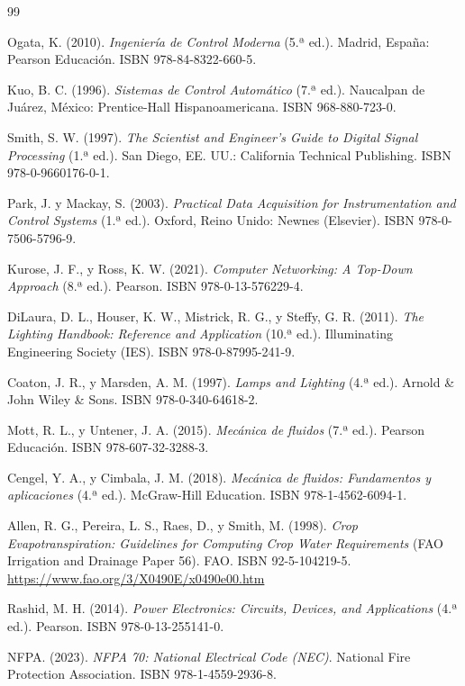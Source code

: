 \renewcommand{\bibname}{Bibliografía}
\begin{thebibliography}{99}

Ogata, K. (2010). \textit{Ingeniería de Control Moderna} (5.ª ed.). Madrid, España: Pearson Educación. ISBN 978-84-8322-660-5.

Kuo, B. C. (1996). \textit{Sistemas de Control Automático} (7.ª ed.). Naucalpan de Juárez, México: Prentice-Hall Hispanoamericana. ISBN 968-880-723-0.

Smith, S. W. (1997). \textit{The Scientist and Engineer's Guide to Digital Signal Processing} (1.ª ed.). San Diego, EE. UU.: California Technical Publishing. ISBN 978-0-9660176-0-1.

Park, J. y Mackay, S. (2003). \textit{Practical Data Acquisition for Instrumentation and Control Systems} (1.ª ed.). Oxford, Reino Unido: Newnes (Elsevier). ISBN 978-0-7506-5796-9.

Kurose, J. F., y Ross, K. W. (2021). \textit{Computer Networking: A Top-Down Approach} (8.ª ed.). Pearson. ISBN 978-0-13-576229-4.

DiLaura, D. L., Houser, K. W., Mistrick, R. G., y Steffy, G. R. (2011). \textit{The Lighting Handbook: Reference and Application} (10.ª ed.). Illuminating Engineering Society (IES). ISBN 978-0-87995-241-9.

Coaton, J. R., y Marsden, A. M. (1997). \textit{Lamps and Lighting} (4.ª ed.). Arnold \& John Wiley \& Sons. ISBN 978-0-340-64618-2.

Mott, R. L., y Untener, J. A. (2015). \textit{Mecánica de fluidos} (7.ª ed.). Pearson Educación. ISBN 978-607-32-3288-3.

Cengel, Y. A., y Cimbala, J. M. (2018). \textit{Mecánica de fluidos: Fundamentos y aplicaciones} (4.ª ed.). McGraw-Hill Education. ISBN 978-1-4562-6094-1.

Allen, R. G., Pereira, L. S., Raes, D., y Smith, M. (1998). \textit{Crop Evapotranspiration: Guidelines for Computing Crop Water Requirements} (FAO Irrigation and Drainage Paper 56). FAO. ISBN 92-5-104219-5. \url{https://www.fao.org/3/X0490E/x0490e00.htm}

Rashid, M. H. (2014). \textit{Power Electronics: Circuits, Devices, and Applications} (4.ª ed.). Pearson. ISBN 978-0-13-255141-0.

NFPA. (2023). \textit{NFPA 70: National Electrical Code (NEC)}. National Fire Protection Association. ISBN 978-1-4559-2936-8. 
\end{thebibliography}
